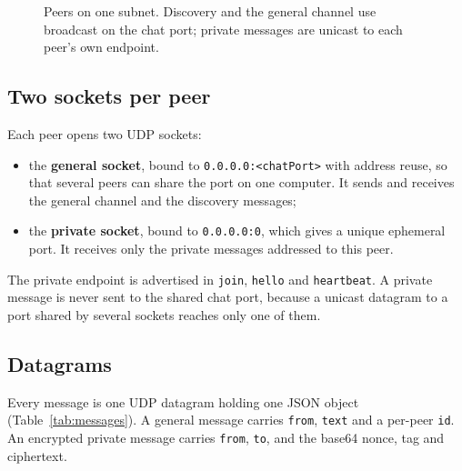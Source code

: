 \documentclass[12pt,a4paper]{article}
\begin{document}
\begin{figure}[H]
\centering
{}
\caption{Peers on one subnet. Discovery and the general channel use broadcast on
the chat port; private messages are unicast to each peer's own endpoint.}
\label{fig:architecture}
\end{figure}

\subsection{Two sockets per peer}
Each peer opens two UDP sockets:
\begin{itemize}[itemsep=2pt]
  \item the \textbf{general socket}, bound to \texttt{0.0.0.0:<chatPort>} with
        address reuse, so that several peers can share the port on one computer.
        It sends and receives the general channel and the discovery messages;
  \item the \textbf{private socket}, bound to \texttt{0.0.0.0:0}, which gives a
        unique ephemeral port. It receives only the private messages addressed to
        this peer.
\end{itemize}
The private endpoint is advertised in \texttt{join}, \texttt{hello} and
\texttt{heartbeat}. A private message is never sent to the shared chat port,
because a unicast datagram to a port shared by several sockets reaches only one
of them.

\subsection{Datagrams}
Every message is one UDP datagram holding one JSON object (Table~\ref{tab:messages}).
A general message carries \texttt{from}, \texttt{text} and a per-peer \texttt{id}.
An encrypted private message carries \texttt{from}, \texttt{to}, and the base64
nonce, tag and ciphertext.
\end{document}
